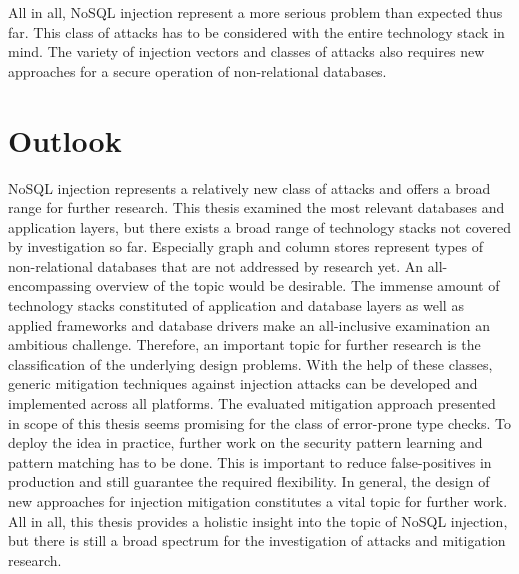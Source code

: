 All in all, NoSQL injection represent a more serious problem than expected thus far. This class of attacks has to be considered with the entire technology stack in mind. The variety of injection vectors and classes of attacks also requires new approaches for a secure operation of non-relational databases. 

\section{Outlook}
NoSQL injection represents a relatively new class of attacks and offers a broad range for further research. This thesis examined the most relevant databases and application layers, but there exists a broad range of technology stacks not covered by investigation so far. Especially graph and column stores represent types of non-relational databases that are not addressed by research yet. An all-encompassing overview of the topic would be desirable. The immense amount of technology stacks constituted of application and database layers as well as applied frameworks and database drivers make an all-inclusive examination an ambitious challenge. Therefore, an important topic for further research is the classification of the underlying design problems. With the help of these classes, generic mitigation techniques against injection attacks can be developed and implemented across all platforms. The evaluated mitigation approach presented in scope of this thesis seems promising for the class of error-prone type checks. To deploy the idea in practice, further work on the security pattern learning and pattern matching has to be done. This is important to reduce false-positives in production and still guarantee the required flexibility. In general, the design of new approaches for injection mitigation constitutes a vital topic for further work. All in all, this thesis provides a holistic insight into the topic of NoSQL injection, but there is still a broad spectrum for the investigation of attacks and mitigation research. 